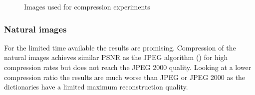 \begin{figure}[h]
\hspace{5mm}
\hspace{5mm}
\hspace{5mm}
\hspace{5mm}
\caption{Images used for compression experiments}
\label{fig:comp_images}
\end{figure}

\newpage
\subsubsection{Natural images}
For the limited time available the results are promising.
Compression of the natural images achieves similar PSNR as the JPEG algorithm
() for high compression rates but does not reach the
JPEG 2000 quality.  Looking at a lower compression ratio the results are much
worse than JPEG or JPEG 2000 as the dictionaries have a limited maximum
reconstruction quality.

